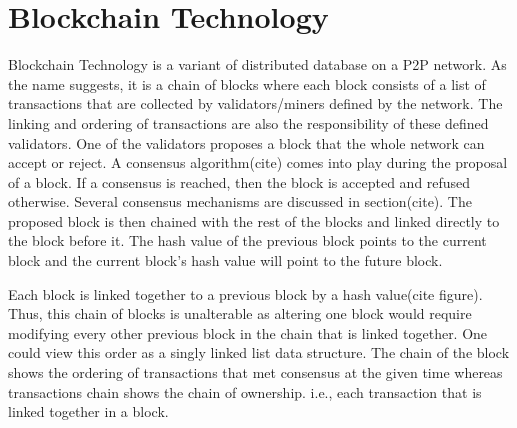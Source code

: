 

\section{Blockchain Technology}
Blockchain Technology is a variant of distributed database on a P2P network. As
the name suggests, it is a chain of blocks where each block consists of a list
of transactions that are collected by validators/miners defined by the network.
The linking and ordering of transactions are also the responsibility of these
defined validators. One of the validators proposes a block that the whole
network can accept or reject. A consensus algorithm(cite) comes into play
during the proposal of a block. If a consensus is reached, then the block is
accepted and refused otherwise. Several consensus mechanisms are discussed in
section(cite). The proposed block is then chained with the rest of the blocks
and linked directly to the block before it. The hash value of the previous
block points to the current block and the current block's hash value will point
to the future block. 

Each block is linked together to a previous block by a hash value(cite figure).
Thus, this chain of blocks is unalterable as altering one block would require
modifying every other previous block in the chain that is linked together. One
could view this order as a singly linked list data structure. The chain of the
block shows the ordering of transactions that met consensus at the given time
whereas transactions chain shows the chain of ownership. i.e., each transaction
that is linked together in a block.





